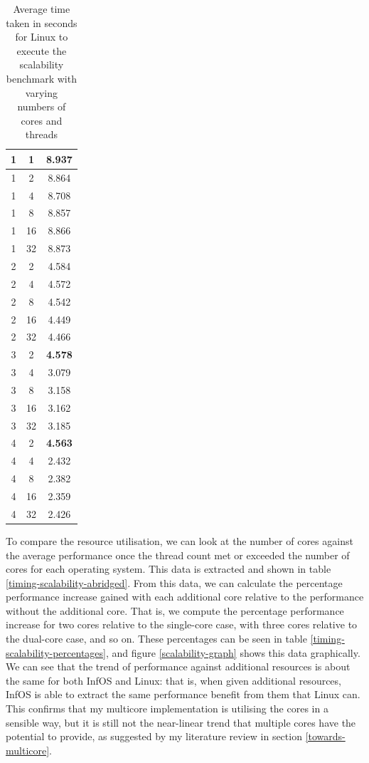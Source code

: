 \documentclass[bsc,frontabs,singlespacing,parskip,deptreport]{infthesis}     %
\begin{document}
\begin{table}[h]
{\begin{tabular}{ccc}
1 &1 &8.937 \\
\midrule
1 &2 &8.864 \\
1 &4 &8.708 \\
1 &8 &8.857 \\
1 &16 &8.866 \\
1 &32 &8.873 \\
\midrule
2 &2 &4.584 \\
2 &4 &4.572 \\
2 &8 &4.542 \\
2 &16 &4.449 \\
2 &32 &4.466 \\
\midrule
3 &2 &\textbf{4.578} \\
3 &4 &3.079 \\
3 &8 &3.158 \\
3 &16 &3.162 \\
3 &32 &3.185 \\
\midrule
4 &2 &\textbf{4.563} \\
4 &4 &2.432 \\
4 &8 &2.382 \\
4 &16 &2.359 \\
4 &32 &2.426 \\
\bottomrule
\end{tabular}
\caption{Average time taken in seconds for Linux to execute the scalability benchmark with varying numbers of cores and threads}\label{timing-scalability-linux}
}
\end{table}

To compare the resource utilisation, we can look at the number of cores against the average performance once the thread count met or exceeded the number of cores for each operating system. This data is extracted and shown in table \ref{timing-scalability-abridged}. From this data, we can calculate the percentage performance increase gained with each additional core relative to the performance without the additional core. That is, we compute the percentage performance increase for two cores relative to the single-core case, with three cores relative to the dual-core case, and so on. These percentages can be seen in table \ref{timing-scalability-percentages}, and figure \ref{scalability-graph} shows this data graphically. We can see that the trend of performance against additional resources is about the same for both InfOS and Linux: that is, when given additional resources, InfOS is able to extract the same performance benefit from them that Linux can. This confirms that my multicore implementation is utilising the cores in a sensible way, but it is still not the near-linear trend that multiple cores have the potential to provide, as suggested by my literature review in section \ref{towards-multicore}.
\end{document}
